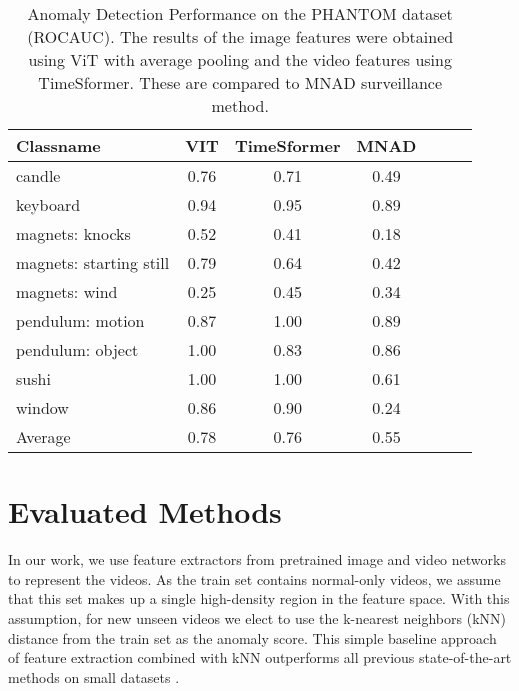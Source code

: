 \documentclass{article}
\begin{document}
\begin{table}[h]
  \centering
  \label{tab:phantom_eval}

    \begin{tabular}{lcccccc}
    \toprule      

	Classname	&	VIT	&	TimeSformer	&	MNAD	\\
\midrule								
	candle	&	0.76	&	0.71	&	0.49	\\
	keyboard	&	0.94	&	0.95	&	0.89	\\
	magnets: knocks	&	0.52	&	0.41	&	0.18	\\
	magnets: starting still	&	0.79	&	0.64	&	0.42	\\
	magnets: wind	&	0.25	&	0.45	&	0.34	\\
	pendulum: motion	&	0.87	&	1.00	&	0.89	\\
	pendulum: object	&	1.00	&	0.83	&	0.86	\\
	sushi	&	1.00	&	1.00	&	0.61	\\
	window	&	0.86	&	0.90	&	0.24	\\
\midrule								
	Average	&	0.78	&	0.76	&	0.55	\\
	 \bottomrule
    \end{tabular}
    \caption{Anomaly Detection Performance on the PHANTOM dataset (ROCAUC). The results of the image features were obtained using ViT with average pooling and the video features using TimeSformer. These are compared to MNAD surveillance method.}
\end{table}












\section{Evaluated Methods}
\label{sec:methods}
In our work, we use feature extractors from pretrained image and video networks to represent the videos. As the train set contains normal-only videos, we assume that this set makes up a single high-density region in the feature space. With this assumption, for new unseen videos we elect to use the k-nearest neighbors (kNN) distance from the train set as the anomaly score. This simple baseline approach of feature extraction combined with kNN outperforms all previous state-of-the-art methods on small datasets \cite{reiss2021panda}.
\end{document}
